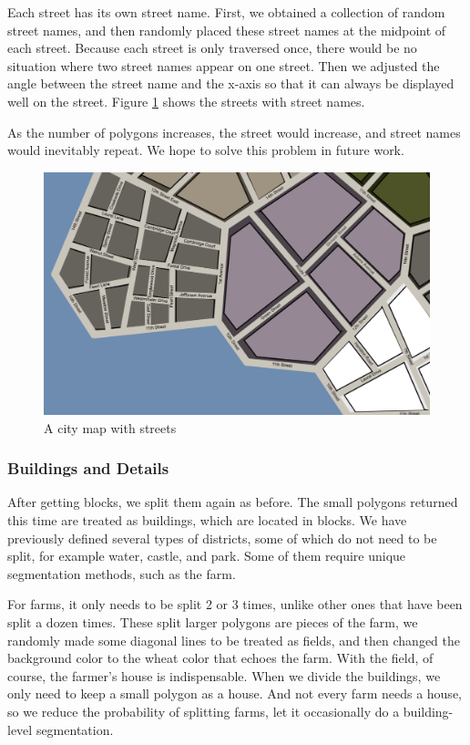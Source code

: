 Each street has its own street name. First, we obtained a collection of random street names, and then randomly placed these street names at the midpoint of each street. Because each street is only traversed once, there would be no situation where two street names appear on one street. Then we adjusted the angle between the street name and the x-axis so that it can always be displayed well on the street. Figure \ref{fig:streets} shows the streets with street names.

As the number of polygons increases, the street would increase, and street names would inevitably repeat. We hope to solve this problem in future work.

\begin{figure}[htbp]
  \centering
  \includegraphics[width=\textwidth]{section04/assets/Map-blocks-streets.png}
  \caption{A city map with streets}
  \label{fig:streets}
\end{figure}

\subsubsection{Buildings and Details}
After getting blocks, we split them again as before. The small polygons returned this time are treated as buildings, which are located in blocks. We have previously defined several types of districts, some of which do not need to be split, for example water, castle, and park. Some of them require unique segmentation methods, such as the farm.

For farms, it only needs to be split 2 or 3 times, unlike other ones that have been split a dozen times. These split larger polygons are pieces of the farm, we randomly made some diagonal lines to be treated as fields, and then changed the background color to the wheat color that echoes the farm. With the field, of course, the farmer’s house is indispensable. When we divide the buildings, we only need to keep a small polygon as a house. And not every farm needs a house, so we reduce the probability of splitting farms, let it occasionally do a building-level segmentation.


